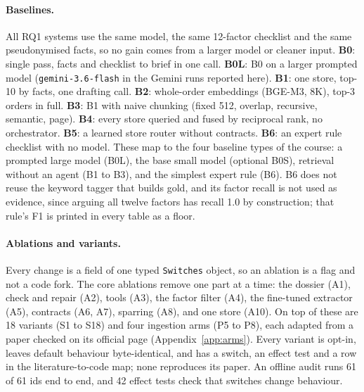 \paragraph{Baselines.} All RQ1 systems use the same model, the same 12-factor checklist and the same pseudonymised facts, so no gain comes from a larger model or cleaner input. \textbf{B0}: single pass, facts and checklist to brief in one call. \textbf{B0L}: B0 on a larger prompted model (\texttt{gemini-3.6-flash} in the Gemini runs reported here). \textbf{B1}: one store, top-10 by facts, one drafting call. \textbf{B2}: whole-order embeddings (BGE-M3, 8K), top-3 orders in full. \textbf{B3}: B1 with naive chunking (fixed 512, overlap, recursive, semantic, page). \textbf{B4}: every store queried and fused by reciprocal rank, no orchestrator. \textbf{B5}: a learned store router without contracts. \textbf{B6}: an expert rule checklist with no model. These map to the four baseline types of the course: a prompted large model (B0L), the base small model (optional B0S), retrieval without an agent (B1 to B3), and the simplest expert rule (B6). B6 does not reuse the keyword tagger that builds gold, and its factor recall is not used as evidence, since arguing all twelve factors has recall 1.0 by construction; that rule's F1 is printed in every table as a floor.

\paragraph{Ablations and variants.} Every change is a field of one typed \texttt{Switches} object, so an ablation is a flag and not a code fork. The core ablations remove one part at a time: the dossier (A1), check and repair (A2), tools (A3), the factor filter (A4), the fine-tuned extractor (A5), contracts (A6, A7), sparring (A8), and one store (A10). On top of these are 18 variants (S1 to S18) and four ingestion arms (P5 to P8), each adapted from a paper checked on its official page (Appendix~\ref{app:arms}). Every variant is opt-in, leaves default behaviour byte-identical, and has a switch, an effect test and a row in the literature-to-code map; none reproduces its paper. An offline audit runs 61 of 61 ids end to end, and 42 effect tests check that switches change behaviour.


